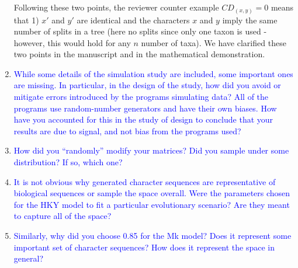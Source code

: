 \documentclass[12pt,letterpaper]{article}
\begin{document}
\begin{enumerate}
Following these two points, the reviewer counter example $CD_{(x,y)} = 0$ means that 1) $x'$ and $y'$ are identical and the characters $x$ and $y$ imply the same number of splits in a tree (here no splits since only one taxon is used - however, this would hold for any $n$ number of taxa).
We have clarified these two points in the manuscript and in the mathematical demonstration.


\item{\textcolor{blue}{While some details of the simulation study are included, some important ones are missing. In particular, in the design of the study, how did you avoid or mitigate errors introduced by the programs simulating data? All of the programs use random-number generators and have their own biases. How have you accounted for this in the study of design to conclude that your results are due to signal, and not bias from the programs used?}}


\item{\textcolor{blue}{How did you ``randomly'' modify your matrices? Did you sample under some distribution? If so, which one?}}


\item{\textcolor{blue}{It is not obvious why generated character sequences are representative of biological sequences or sample the space overall. Were the parameters chosen for the HKY model to fit a particular evolutionary scenario? Are they meant to capture all of the space?}}


\item{\textcolor{blue}{Similarly, why did you choose 0.85 for the Mk model? Does it represent some important set of character sequences? How does it represent the space in general?}}


\end{enumerate}
\end{document}
